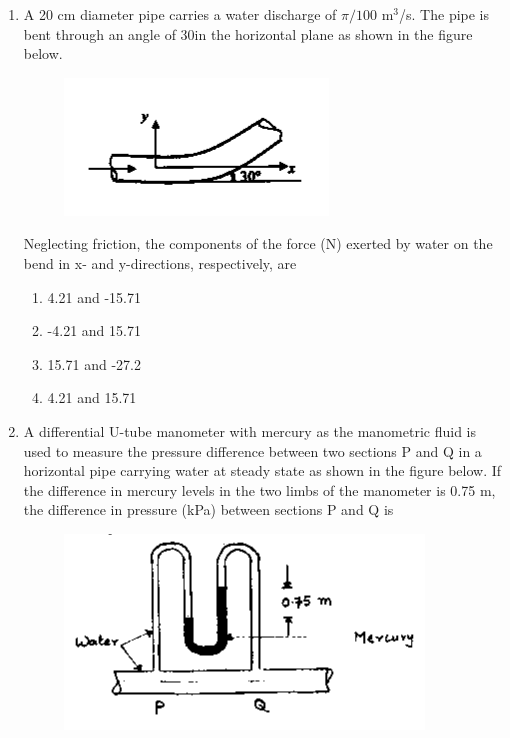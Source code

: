 \documentclass[a4paper,10pt]{article}
\begin{document}
\begin{enumerate}
\begin{multicols}{2}
\begin{enumerate}
\item H is proportional to r
\item H is proportional to $r^2$
\item H is proportional to $r^3$
\item H is proportional to $r^4$
\end{enumerate}
\end{multicols}

\item A 20 cm diameter pipe carries a water discharge of $\pi/100$ m$^3$/s. The pipe is bent through an angle of 30\degree in the horizontal plane as shown in the figure below.
\begin{figure}[H]
    \centering
    \includegraphics[width=0.4\columnwidth]{Bq13.png}
    \caption*{}
    \label{fig:q13}
\end{figure}
Neglecting friction, the components of the force (N) exerted by water on the bend in x- and y-directions, respectively, are
\hfill{}

\begin{multicols}{2}
\begin{enumerate}
\item 4.21 and -15.71
\item -4.21 and 15.71
\item 15.71 and -27.2
\item 4.21 and 15.71
\end{enumerate}
\end{multicols}

\item A differential U-tube manometer with mercury as the manometric fluid is used to measure the pressure difference between two sections P and Q in a horizontal pipe carrying water at steady state as shown in the figure below. If the difference in mercury levels in the two limbs of the manometer is 0.75 m, the difference in pressure (kPa) between sections P and Q is
\begin{figure}[H]
    \centering
    \includegraphics[width=0.4\columnwidth]{Bq14.png}
    \caption*{}
    \label{fig:q14}
\end{figure}
\hfill{}


\end{enumerate}
\end{document}
